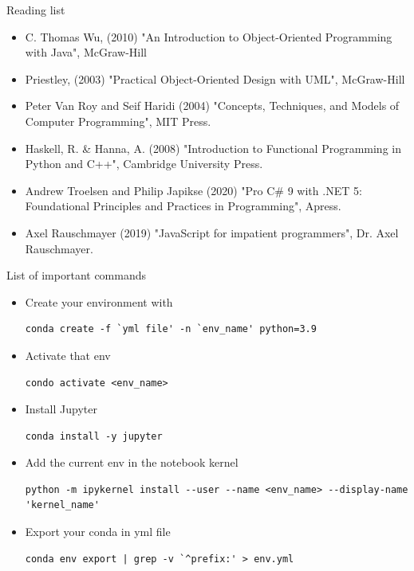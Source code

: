 \documentclass[10pt]{beamer}
\begin{document}
\begin{frame}{Reading list}
\begin{itemize}
\item C. Thomas Wu, (2010) "An Introduction to Object-Oriented Programming with Java", McGraw-Hill  

\item Priestley, (2003) "Practical Object-Oriented Design with UML", McGraw-Hill 

\item Peter Van Roy and Seif Haridi (2004) "Concepts, Techniques, and Models of Computer Programming", MIT Press. 

\item Haskell, R. \& Hanna, A. (2008) "Introduction to Functional Programming in Python and C++", Cambridge University Press. 

\item Andrew Troelsen and Philip Japikse (2020) "Pro C\# 9 with .NET 5: Foundational Principles and Practices in Programming", Apress. 

\item Axel Rauschmayer (2019) "JavaScript for impatient programmers", Dr. Axel Rauschmayer. 


\end{itemize}
\end{frame}

\begin{frame}[fragile]{List of important commands}
\begin{itemize}
\item Create your environment with
\begin{lstlisting}[style=advancedshell]
conda create -f `yml file' -n `env_name' python=3.9 
\end{lstlisting}

\item Activate that env
\begin{lstlisting}[style=advancedshell]
condo activate <env_name>
\end{lstlisting}
\item Install Jupyter
\begin{lstlisting}[style=advancedshell]
conda install -y jupyter  
\end{lstlisting}
\item Add the current env in the notebook kernel
\begin{lstlisting}[style=advancedshell]
python -m ipykernel install --user --name <env_name> --display-name 'kernel_name'
\end{lstlisting}
\item Export your conda in yml file 
\begin{lstlisting}[style=advancedshell]
conda env export | grep -v `^prefix:' > env.yml  
\end{lstlisting}
\end{itemize}
\end{frame}
\end{document}
